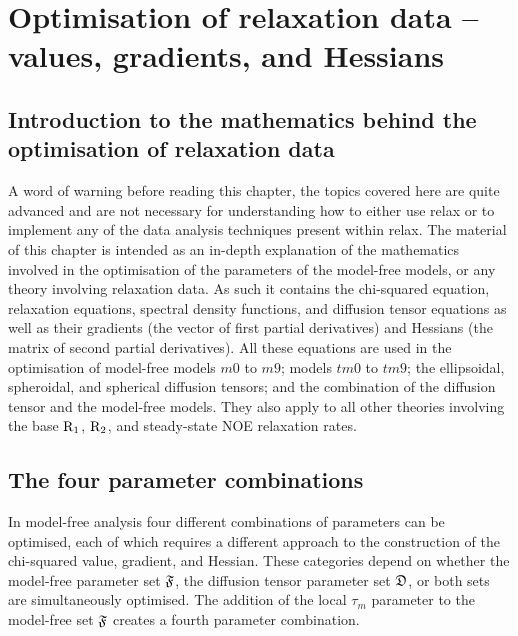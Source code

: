 
\chapter{Optimisation of relaxation data -- values, gradients, and Hessians} \label{ch: values, gradients, and Hessians}




\section{Introduction to the mathematics behind the optimisation of relaxation data}


A word of warning before reading this chapter, the topics covered here are quite advanced and are not necessary for understanding how to either use relax or to implement any of the data analysis techniques present within relax.
The material of this chapter is intended as an in-depth explanation of the mathematics involved in the optimisation of the parameters of the model-free models, or any theory involving relaxation data.
As such it contains the chi-squared equation, relaxation equations, spectral density functions, and diffusion tensor equations as well as their gradients (the vector of first partial derivatives) and Hessians (the matrix of second partial derivatives).
All these equations are used in the optimisation of model-free models $m0$ to $m9$; models $tm0$ to $tm9$; the ellipsoidal, spheroidal, and spherical diffusion tensors; and the combination of the diffusion tensor and the model-free models.
They also apply to all other theories involving the base $\mathrm{R}_1$, $\mathrm{R}_2$, and steady-state NOE relaxation rates.




\section{The four parameter combinations}

In model-free analysis four different combinations of parameters can be optimised, each of which requires a different approach to the construction of the chi-squared value, gradient, and Hessian.
These categories depend on whether the model-free parameter set $\mathfrak{F}$, the diffusion tensor parameter set $\mathfrak{D}$, or both sets are simultaneously optimised.
The addition of the local $\tau_m$ parameter to the model-free set $\mathfrak{F}$ creates a fourth parameter combination.




